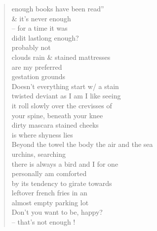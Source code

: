 \documentclass[11pt]{article}
\begin{document}
\begin{verse}
\hspace*{7em}enough books have been read''\\
\& it's never enough\\
\hspace*{1em}-- for a time it was\\
\hspace*{2em}didit lastlong enough?\\
\hspace*{3em}probably not\\
\vspace*{1em}
\hspace*{1em}clouds rain \& stained mattresses\\
\hspace*{2em}are my preferred\\
\hspace*{4em}gestation grounds\\
Doesn't everything start w/ a stain\\
\hspace*{2em}twisted deviant as I am I like seeing\\
\hspace*{2em}it  roll slowly over the crevisses of\\
\hspace*{3em}your spine, beneath your knee\\
\vspace*{1em}
\hspace*{3em}dirty mascara stained cheeks\\
\hspace*{4em}is where shyness lies\\
\vspace*{1em}
Beyond the towel the body the air and the sea\\
\hspace*{1em}urchins, searching\\
there is always a bird and I for one\\
personally am comforted\\
by its tendency to girate towards\\
leftover french fries in an\\
almost empty parking lot\\
\vspace*{1em}
\hspace*{4em}Don't you want to be, happy?\\
\hspace*{6em}-- that's not enough !\\

\end{verse}
\end{document}
